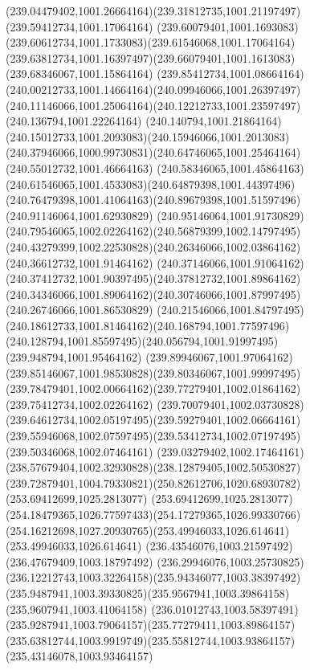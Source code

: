 {    \curveto(239.04479402,1001.26664164)(239.31812735,1001.21197497)(239.59412734,1001.17064164)
    \curveto(239.60079401,1001.1693083)(239.60612734,1001.1733083)(239.61546068,1001.17064164)
    \curveto(239.63812734,1001.16397497)(239.66079401,1001.1613083)(239.68346067,1001.15864164)
    \curveto(239.85412734,1001.08664164)(240.00212733,1001.14664164)(240.09946066,1001.26397497)
    \curveto(240.11146066,1001.25064164)(240.12212733,1001.23597497)(240.136794,1001.22264164)
    \curveto(240.140794,1001.21864164)(240.15012733,1001.2093083)(240.15946066,1001.2013083)
    \curveto(240.37946066,1000.99730831)(240.64746065,1001.25464164)(240.55012732,1001.46664163)
    \curveto(240.58346065,1001.45864163)(240.61546065,1001.4533083)(240.64879398,1001.44397496)
    \curveto(240.76479398,1001.41064163)(240.89679398,1001.51597496)(240.91146064,1001.62930829)
    \curveto(240.95146064,1001.91730829)(240.79546065,1002.02264162)(240.56879399,1002.14797495)
    \curveto(240.43279399,1002.22530828)(240.26346066,1002.03864162)(240.36612732,1001.91464162)
    \curveto(240.37146066,1001.91064162)(240.37412732,1001.90397495)(240.37812732,1001.89864162)
    \curveto(240.34346066,1001.89064162)(240.30746066,1001.87997495)(240.26746066,1001.86530829)
    \curveto(240.21546066,1001.84797495)(240.18612733,1001.81464162)(240.168794,1001.77597496)
    \curveto(240.128794,1001.85597495)(240.056794,1001.91997495)(239.948794,1001.95464162)
    \curveto(239.89946067,1001.97064162)(239.85146067,1001.98530828)(239.80346067,1001.99997495)
    \curveto(239.78479401,1002.00664162)(239.77279401,1002.01864162)(239.75412734,1002.02264162)
    \curveto(239.70079401,1002.03730828)(239.64612734,1002.05197495)(239.59279401,1002.06664161)
    \curveto(239.55946068,1002.07597495)(239.53412734,1002.07197495)(239.50346068,1002.07464161)
    \curveto(239.03279402,1002.17464161)(238.57679404,1002.32930828)(238.12879405,1002.50530827)
    \curveto(239.72879401,1004.79330821)(250.82612706,1020.68930782)(253.69412699,1025.2813077)
    \curveto(253.69412699,1025.2813077)(254.18479365,1026.77597433)(254.17279365,1026.99330766)
    \curveto(254.16212698,1027.20930765)(253.49946033,1026.614641)(253.49946033,1026.614641)
    \lineto(236.43546076,1003.21597492)
    \lineto(236.47679409,1003.18797492)
    \curveto(236.29946076,1003.25730825)(236.12212743,1003.32264158)(235.94346077,1003.38397492)
    \curveto(235.9487941,1003.39330825)(235.9567941,1003.39864158)(235.9607941,1003.41064158)
    \curveto(236.01012743,1003.58397491)(235.9287941,1003.79064157)(235.77279411,1003.89864157)
    \curveto(235.63812744,1003.9919749)(235.55812744,1003.93864157)(235.43146078,1003.93464157)
}
